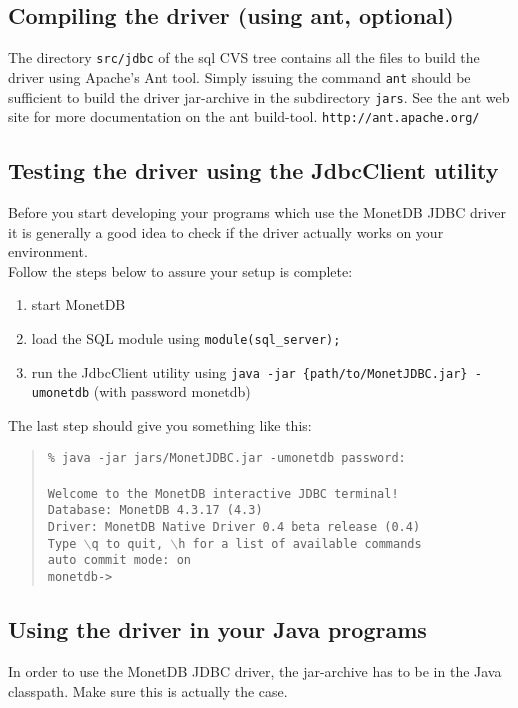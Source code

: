 \documentclass{article}
\begin{document}
\subsection{Compiling the driver (using ant, optional)}
The directory \texttt{src/jdbc} of the sql CVS tree contains all the files to build the driver using
Apache's Ant tool. Simply issuing the command \texttt{ant} should be sufficient to build the driver
jar-archive in the subdirectory \texttt{jars}. See the ant web site for more documentation on the
ant build-tool. \texttt{http://ant.apache.org/}

\subsection{Testing the driver using the JdbcClient utility}
Before you start developing your programs which use the MonetDB JDBC driver it is generally
a good idea to check if the driver actually works on your environment.\\
Follow the steps below to assure your setup is complete:
\begin{enumerate}
\item start MonetDB
\item load the SQL module using \texttt{module(sql\_server);}
\item run the JdbcClient utility using \texttt{java -jar \{path/to/MonetJDBC.jar\} -umonetdb} (with
 password monetdb)
\end{enumerate}
The last step should give you something like this:
\begin{quote}
\texttt{\% java -jar jars/MonetJDBC.jar -umonetdb
password:  \\
\\
Welcome to the MonetDB interactive JDBC terminal!\\
Database: MonetDB 4.3.17 (4.3)\\
Driver: MonetDB Native Driver 0.4 beta release (0.4)\\
Type $\backslash$q to quit, $\backslash$h for a list of available commands\\
auto commit mode: on\\
monetdb->}
\end{quote}

\subsection{Using the driver in your Java programs}
In order to use the MonetDB JDBC driver, the jar-archive has to be in the Java classpath.
Make sure this is actually the case.
\end{document}
